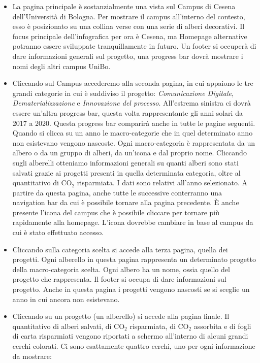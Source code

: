 \begin{itemize}
    \item La pagina principale è sostanzialmente una vista sul Campus di Cesena dell’Università di Bologna. Per mostrare il campus all’interno del contesto, esso è posizionato su una collina verse con una serie di alberi decorativi. Il focus principale dell'infografica per ora è Cesena, ma Homepage alternative potranno essere sviluppate tranquillamente in futuro. Un footer si occuperà di dare informazioni generali sul progetto, una progress bar dovrà mostrare i nomi degli altri campus UniBo.
    \item Cliccando sul Campus accederemo alla seconda pagina, in cui appaiono le tre grandi categorie in cui è suddiviso il progetto: \textit{Comunicazione Digitale}, \textit{Dematerializzazione} e \textit{Innovazione del processo}.\newline
All'estrema sinistra ci dovrà essere un'altra progress bar, questa volta rappresentante gli anni solari da 2017 a 2020.
Questa progress bar comparirà anche in tutte le pagine seguenti. Quando si clicca su un anno le macro-categorie che in quel determinato anno non esistevano vengono nascoste.
Ogni macro-categoria è rappresentata da un albero o da un gruppo di alberi, da un'icona e dal proprio nome. Cliccando sugli alberelli otteniamo informazioni generali su quanti alberi sono stati salvati grazie ai progetti presenti in quella determinata categoria, oltre al quantitativo di CO$_2$ risparmiata. I dati sono relativi all'anno selezionato.\newline
A partire da questa pagina, anche tutte le successive conterranno una navigation bar da cui è possibile tornare alla pagina precedente. È anche presente l'icona del campus che è possibile cliccare per tornare più rapidamente alla homepage. L'icona dovrebbe cambiare in base al campus da cui è stato effettuato accesso.
\item Cliccando sulla categoria scelta si accede alla terza pagina, quella dei progetti. Ogni alberello in questa pagina rappresenta un determinato progetto della macro-categoria scelta. Ogni albero ha un nome, ossia quello del progetto che rappresenta. Il footer si occupa di dare informazioni sul progetto. Anche in questa pagina i progetti vengono nascosti se si sceglie un anno in cui ancora non esistevano.
\item Cliccando su un progetto (un alberello) si accede alla pagina finale. Il quantitativo di alberi salvati, di CO$_2$ risparmiata, di CO$_2$ assorbita e di fogli di carta risparmiati vengono riportati a schermo all'interno di alcuni grandi cerchi colorati. Ci sono esattamente quattro cerchi, uno per ogni informazione da mostrare:

\end{itemize}
